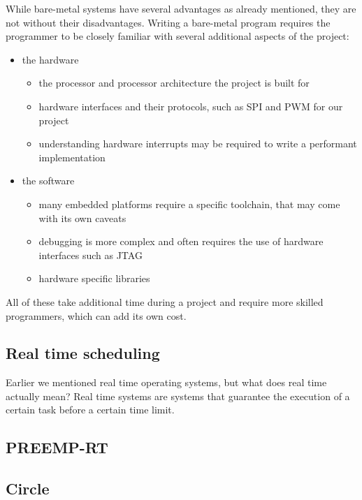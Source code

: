 While bare-metal systems have several advantages as already mentioned, they are not without their disadvantages.
Writing a bare-metal program requires the programmer to be closely familiar with several additional aspects of the project:
\begin{itemize}
    \item the hardware
    \begin{itemize}
        \item the processor and processor architecture the project is built for
        \item hardware interfaces and their protocols, such as SPI and PWM for our project
        \item understanding hardware interrupts may be required to write a performant implementation
    \end{itemize}
    \item the software
    \begin{itemize}
        \item many embedded platforms require a specific toolchain, that may come with its own caveats
        \item debugging is more complex and often requires the use of hardware interfaces such as JTAG
        \item hardware specific libraries
    \end{itemize}
\end{itemize}
All of these take additional time during a project and require more skilled programmers, which can add its own cost.

\subsection{Real time scheduling}
\label{sec:background:bm_vs_os:rtos}

Earlier we mentioned real time operating systems, but what does real time actually mean?
Real time systems are systems that guarantee the execution of a certain task before a certain time limit.


\subsection{PREEMP-RT}
\label{sec:background:bm_vs_os:preempt_rt}

\subsection{Circle}
\label{sec:background:bm_vs_os:circle}

